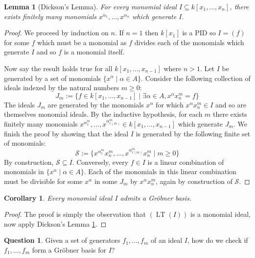 \documentclass[12pt]{article}
\theoremstyle{plain}
\newtheorem{lemma}[thm]{Lemma}
\newtheorem{cor}[thm]{Corollary}
\theoremstyle{definition}
\newtheorem{question}[thm]{Question}
\newcommand{\scr}[1]{\mathscr{#1}}
\begin{document}
\begin{lemma}[Dickson's Lemma]\label{lem:Dickson}
For every monomial ideal $I \subseteq k[x_1,...,x_n]$, there exists finitely many monomials $x^{\alpha_1},...,x^{\alpha_n}$ which generate $I$.
\end{lemma}
\begin{proof}
We proceed by induction on $n$. If $n = 1$ then $k[x_1]$ is a PID so $I = (f)$ for some $f$ which must be a monomial as $f$ divides each of the monomials which generate $I$ and so $f$ is a monomial itself.

Now say the result holds true for all $k[x_1,...,x_{n-1}]$ where $n > 1$. Let $I$ be generated by a set of monomials $\lbrace x^\alpha \mid \alpha \in A \rbrace$. Consider the following collection of ideals indexed by the natural numbers $m \geq 0$:
\begin{equation}
    J_m := \lbrace f \in k[x_1,...,x_{n-1}] \mid \exists \alpha \in A, x^\alpha x_n^{m} = f\rbrace
\end{equation}
The ideals $J_m$ are generated by the monomials $x^\alpha$ for which $x^\alpha x_{n}^m \in I$ and so are themselves monomial ideals. By the inductive hypothesis, for each $m$ there exists finitely many monomials $x^{\alpha_1^m},...,x^{\alpha_{r(m)}^m} \in k[x_1,...,x_{n-1}]$ which generate $J_m$. We finish the proof by showing that the ideal $I$ is generated by the following finite set of monomials:
\begin{equation}
\scr{S} := \lbrace x^{\alpha_1^m}x_n^m,...,x^{\alpha_{r(m)}^m}x_n^m \mid m \geq 0\rbrace
\end{equation}
By construction, $\scr{S} \subseteq I$. Conversely, every $f \in I$ is a linear combination of monomials in $\lbrace x^\alpha \mid \alpha \in A \rbrace$. Each of the monomials in this linear combination must be divisible for some $x^\alpha$ in some $J_m$ by $x^\alpha x_n^m$, again by construction of $\scr{S}$.
\end{proof}
\begin{cor}\label{cor:grobner_basis_existence}
Every monomial ideal $I$ admits a Gr\"{o}bner basis.
\end{cor}
\begin{proof}
The proof is simply the observation that $(\operatorname{LT}(I))$ is a monomial ideal, now apply Dickson's Lemma \ref{lem:Dickson}.
\end{proof}
\begin{question}\label{question:Grobner_check}
Given a set of generators $f_1,...,f_m$ of an ideal $I$, how do we check if $f_1,...,f_m$ form a Gr\"{o}bner basis for $I$?
\end{question}
\end{document}
